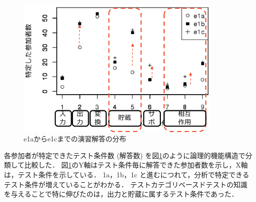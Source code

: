 \begin{figure}[htbp]
  \begin{center}
  \includegraphics[width=10cm]{./image/D-3-Fig12-1.png}
  \caption{e1aからe1cまでの演習解答の分布}
  \label{fig:D-3-Fig12-1}
  \end{center}
\end{figure}
各参加者が特定できたテスト条件数 (解答数) を図\ref{fig:D-3-Fig12-1}のように論理的機能構造で分類して比較した．
図\ref{fig:D-3-Fig12-1}のY軸はテスト条件毎に解答できた参加者数を示し，X軸は，テスト条件を示している．
1a，1b，1c と進むにつれて，分析で特定できるテスト条件が増えていることがわかる．
テストカテゴリベースドテストの知識を与えることで特に伸びたのは，出力と貯蔵に属するテスト条件であった．

